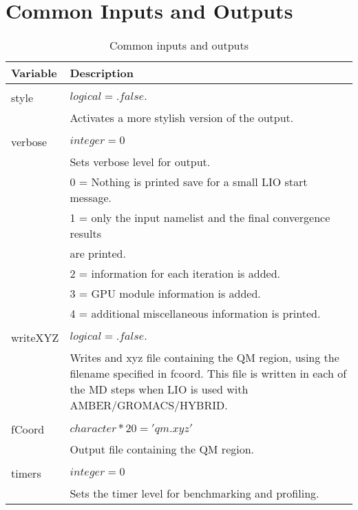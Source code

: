 \section{Common Inputs and Outputs}

\begin{Spacing}{1.0}
   \begin{longtable}{ p{} p{} }
   
      \toprule
      \textbf{Variable} & Description \\*
      \midrule \\*
      \endhead
   
      \bottomrule
      \caption{Common inputs and outputs}
      \endfoot

      style  & $ logical = .false. $ \\
      & Activates a more stylish version of the output. \\
      \\
      verbose & $ integer = 0 $ \\
      & Sets verbose level for output. \\
      &     0 = Nothing is printed save for a small LIO start message.\\
      &     1 = only the input namelist and the final convergence results \\
      &         are printed.\\
      &     2 = information for each iteration is added.\\
      &     3 = GPU module information is added.\\
      &     4 = additional miscellaneous information is printed.\\
      \\
      writeXYZ & $ logical = .false. $\\
      & Writes and xyz file containing the QM region, using the filename
      specified in fcoord. This file is written in each of the MD steps 
      when LIO is used with AMBER/GROMACS/HYBRID. \\
      \\
      fCoord & $ character*20 = 'qm.xyz' $\\
      & Output file containing the QM region. \\
      \\
      timers & $ integer = 0 $ \\
      & Sets the timer level for benchmarking and profiling. \\

\end{longtable}
\end{Spacing}
